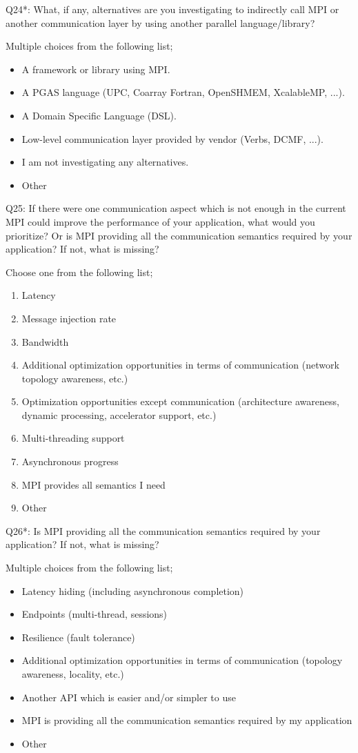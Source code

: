 \begin{description}
\item{Q24*:} What, if any, alternatives are you investigating to
indirectly call MPI or another communication layer by using another
parallel language/library? 

Multiple choices from the following list;
\begin{itemize}
\item A framework or library using MPI.
\item A PGAS language (UPC, Coarray Fortran, OpenSHMEM, XcalableMP, ...).
\item A Domain Specific Language (DSL).
\item Low-level communication layer provided by vendor (Verbs, DCMF, ...).
\item I am not investigating any alternatives.
\item Other
\end{itemize}

\item{Q25:} If there were one communication aspect which is not enough
in the current MPI could improve the performance of your application,
what would you prioritize? Or is MPI providing all the communication
semantics required by your application? If not, what is missing? 

Choose one from the following list;
\begin{enumerate}
\item Latency
\item Message injection rate
\item Bandwidth
\item Additional optimization opportunities in terms of communication
(network topology awareness, etc.) 
\item Optimization opportunities except communication (architecture
awareness, dynamic processing, accelerator support, etc.) 
\item Multi-threading support
\item Asynchronous progress
\item MPI provides all semantics I need
\item Other
\end{enumerate}

\item{Q26*:} Is MPI providing all the communication semantics required
by your application? If not, what is missing? 

Multiple choices from the following list;
\begin{itemize}
\item Latency hiding (including asynchronous completion)
\item Endpoints (multi-thread, sessions)
\item Resilience (fault tolerance)
\item Additional optimization opportunities in terms of communication
(topology awareness, locality, etc.) 
\item Another API which is easier and/or simpler to use
\item MPI is providing all the communication semantics required by my
application 
\item Other
\end{itemize}


\end{description}
